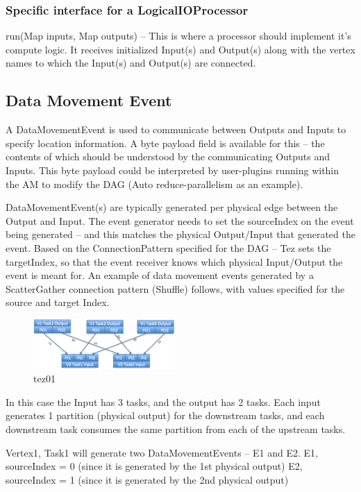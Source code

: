 \documentclass[twocolumn]{article}
\begin{document}
\subsubsection{Specific interface for a LogicalIOProcessor}

run(Map inputs, Map outputs) -- This is where a processor should
implement it's compute logic. It receives initialized Input(s) and
Output(s) along with the vertex names to which the Input(s) and
Output(s) are connected.

\subsection{Data Movement Event}

A DataMovementEvent is used to communicate between Outputs and Inputs to
specify location information. A byte payload field is available for this
-- the contents of which should be understood by the communicating
Outputs and Inputs. This byte payload could be interpreted by
user-plugins running within the AM to modify the DAG (Auto
reduce-parallelism as an example).

DataMovementEvent(s) are typically generated per physical edge between
the Output and Input. The event generator needs to set the sourceIndex
on the event being generated -- and this matches the physical
Output/Input that generated the event. Based on the ConnectionPattern
specified for the DAG -- Tez sets the targetIndex, so that the event
receiver knows which physical Input/Output the event is meant for. An
example of data movement events generated by a ScatterGather connection
pattern (Shuffle) follows, with values specified for the source and
target Index.

\begin{figure}[htb]
        \centering
        \includegraphics[width=0.48\textwidth]{tez02}
        \caption{tez01}
        \label{fig14}
\end{figure}

In this case the Input has 3 tasks, and the output has 2 tasks. Each
input generates 1 partition (physical output) for the downstream tasks,
and each downstream task consumes the same partition from each of the
upstream tasks.

Vertex1, Task1 will generate two DataMovementEvents -- E1 and E2. E1,
sourceIndex = 0 (since it is generated by the 1st physical output) E2,
sourceIndex = 1 (since it is generated by the 2nd physical output)
\end{document}
